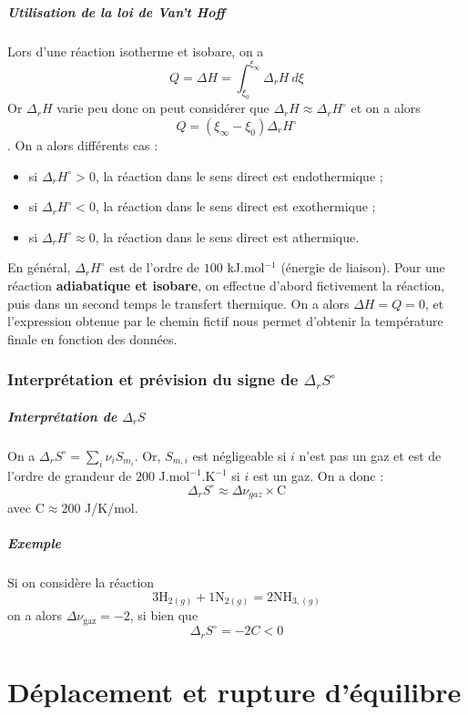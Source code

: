 \documentclass[french]{book}
\theoremstyle{plain}
\theoremstyle{definition}
\theoremstyle{remark}
\newcommand{\inv}{^{-1}}
\begin{document}
\paragraph{Utilisation de la loi de Van't Hoff} Lors d'une réaction isotherme et isobare, on a $$\displaystyle Q=\Delta H=\int_{\xi_0}^{\xi_\infty}\Delta_rH\ d\xi$$ Or $\Delta_rH$ varie peu donc on peut considérer que $\Delta_rH\approx\Delta_rH^\circ$ et on a alors $$Q=\left(\xi_\infty-\xi_0\right)\Delta_rH^\circ$$. On a alors différents cas : 
\begin{itemize}
	\item si $\Delta_rH^\circ>0$, la réaction dans le sens direct est endothermique ;
	\item si $\Delta_rH^\circ<0$, la réaction dans le sens direct est exothermique ;
	\item si $\Delta_rH^\circ\approx0$, la réaction dans le sens direct est athermique.
\end{itemize}
En général, $\Delta_rH^\circ$ est de l'ordre de $100$ kJ.mol$\inv$ (énergie de liaison). Pour une réaction \textbf{adiabatique et isobare}, on effectue d'abord fictivement la réaction, puis dans un second temps le transfert thermique. On a alors $\Delta H=Q=0$, et l'expression obtenue par le chemin fictif nous permet d'obtenir la température finale en fonction des données.
\subsection{Interprétation et prévision du signe de $\Delta_rS^\circ$}
\paragraph{Interprétation de $\Delta_rS$} On a $\Delta_rS^\circ=\displaystyle\sum_i\nu_iS_{m_i}$. Or, $S_{m,i}$ est négligeable si $i$ n'est pas un gaz et est de l'ordre de grandeur de $200$ J.mol$\inv$.K$\inv$ si $i$ est un gaz. On a donc : $$\Delta_rS^\circ\approx\Delta\nu_{gaz}\times\text{C}$$ avec C$\approx$200 J/K/mol.
\paragraph{Exemple} Si on considère la réaction $$3\text{H}_{2(g)}+1\text{N}_{2(g)}=2\text{NH}_{3,(g)}$$ on a alors $\Delta\nu_\text{gaz}=-2$, si bien que $$\Delta_rS^\circ=-2C<0$$
\chapter{Déplacement et rupture d'équilibre}
\localtableofcontents
\end{document}
